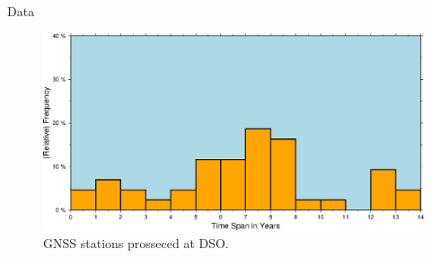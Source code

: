 \documentclass[final,a0,portrait]{beamer}
\newlength{\onecolwid}
\begin{document}
\begin{frame}[t]
\begin{columns}[t]
\begin{column}{\onecolwid}
\begin{block}{Data}
{%
}
\begin{figure}
  \centering
  \includegraphics[width=1\onecolwid]{sample}
  \caption{GNSS stations prosseced at DSO.}
  \label{fig:sta}
\end{figure}
\end{block}




\end{column}
\end{columns}
\end{frame}
\end{document}
